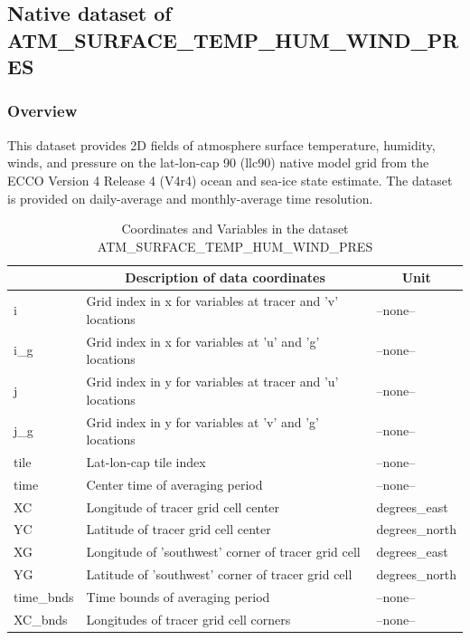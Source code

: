 \subsection{Native dataset of ATM\_SURFACE\_TEMP\_HUM\_WIND\_PRES}
\newp
\subsubsection{Overview}
This dataset provides 2D fields of atmosphere surface temperature, humidity, winds, and pressure on the lat-lon-cap 90 (llc90) native model grid from the ECCO Version 4 Release 4 (V4r4) ocean and sea-ice state estimate. The dataset is provided on daily-average and monthly-average time resolution. 
\begin{longtable}{|m{}|m{}|m{}|}
\caption{Coordinates and Variables in the dataset ATM\_SURFACE\_TEMP\_HUM\_WIND\_PRES}
\label{tab:table-ATM_SURFACE_TEMP_HUM_WIND_PRES-fields} \\ 
\hline \endhead \hline \endfoot
\rowcolor{lightgray} \multicolumn{1}{|c|}{\textbf{Coordinates}} & \multicolumn{1}{|c|}{\textbf{Description of data coordinates}} &  \multicolumn{1}{|c|}{\textbf{Unit}}\\ \hline
i &Grid index in x for variables at tracer and 'v' locations &--none--  \\ \hline
i\_g &Grid index in x for variables at 'u' and 'g' locations &--none--  \\ \hline
j &Grid index in y for variables at tracer and 'u' locations &--none--  \\ \hline
j\_g &Grid index in y for variables at 'v' and 'g' locations &--none--  \\ \hline
tile &Lat-lon-cap tile index &--none--  \\ \hline
time &Center time of averaging period &--none--  \\ \hline
XC &Longitude of tracer grid cell center &degrees\_east  \\ \hline
YC &Latitude of tracer grid cell center &degrees\_north  \\ \hline
XG &Longitude of 'southwest' corner of tracer grid cell &degrees\_east  \\ \hline
YG &Latitude of 'southwest' corner of tracer grid cell &degrees\_north  \\ \hline
time\_bnds &Time bounds of averaging period &--none--  \\ \hline
XC\_bnds &Longitudes of tracer grid cell corners &--none--  \\ \hline

\end{longtable}
